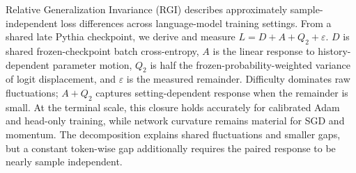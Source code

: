 Relative Generalization Invariance (RGI) describes approximately sample-independent loss differences across language-model training settings.  From a shared late Pythia checkpoint, we derive and measure $L=D+A+Q_2+\varepsilon$.  $D$ is shared frozen-checkpoint batch cross-entropy, $A$ is the linear response to history-dependent parameter motion, $Q_2$ is half the frozen-probability-weighted variance of logit displacement, and $\varepsilon$ is the measured remainder.  Difficulty dominates raw fluctuations; $A+Q_2$ captures setting-dependent response when the remainder is small.  At the terminal scale, this closure holds accurately for calibrated Adam and head-only training, while network curvature remains material for SGD and momentum.  The decomposition explains shared fluctuations and smaller gaps, but a constant token-wise gap additionally requires the paired response to be nearly sample independent.
